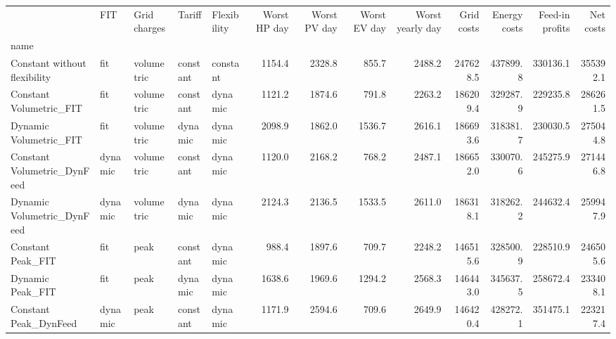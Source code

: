\begin{tabular}{lllllrrrrrrrr}
\toprule
{} &      FIT & Grid charges &    Tariff & Flexibility &  Worst HP day &  Worst PV day &  Worst EV day &  Worst yearly day &  Grid costs &  Energy costs &  Feed-in profits &  Net costs \\
name                         &          &              &           &             &               &               &               &                   &             &               &                  &            \\
\midrule
Constant without flexibility &      fit &   volumetric &  constant &    constant &        1154.4 &        2328.8 &         855.7 &            2488.2 &    247628.5 &      437899.8 &         330136.1 &   355392.1 \\
Constant Volumetric\_FIT      &      fit &   volumetric &  constant &     dynamic &        1121.2 &        1874.6 &         791.8 &            2263.2 &    186209.4 &      329287.9 &         229235.8 &   286261.5 \\
Dynamic Volumetric\_FIT       &      fit &   volumetric &   dynamic &     dynamic &        2098.9 &        1862.0 &        1536.7 &            2616.1 &    186693.6 &      318381.7 &         230030.5 &   275044.8 \\
Constant Volumetric\_DynFeed  &  dynamic &   volumetric &  constant &     dynamic &        1120.0 &        2168.2 &         768.2 &            2487.1 &    186652.0 &      330070.6 &         245275.9 &   271446.8 \\
Dynamic Volumetric\_DynFeed   &  dynamic &   volumetric &   dynamic &     dynamic &        2124.3 &        2136.5 &        1533.5 &            2611.0 &    186318.1 &      318262.2 &         244632.4 &   259947.9 \\
Constant Peak\_FIT            &      fit &         peak &  constant &     dynamic &         988.4 &        1897.6 &         709.7 &            2248.2 &    146515.6 &      328500.9 &         228510.9 &   246505.6 \\
Dynamic Peak\_FIT             &      fit &         peak &   dynamic &     dynamic &        1638.6 &        1969.6 &        1294.2 &            2568.3 &    146443.0 &      345637.5 &         258672.4 &   233408.1 \\
Constant Peak\_DynFeed        &  dynamic &         peak &  constant &     dynamic &        1171.9 &        2594.6 &         709.6 &            2649.9 &    146420.4 &      428272.1 &         351475.1 &   223217.4 \\

\end{tabular}

